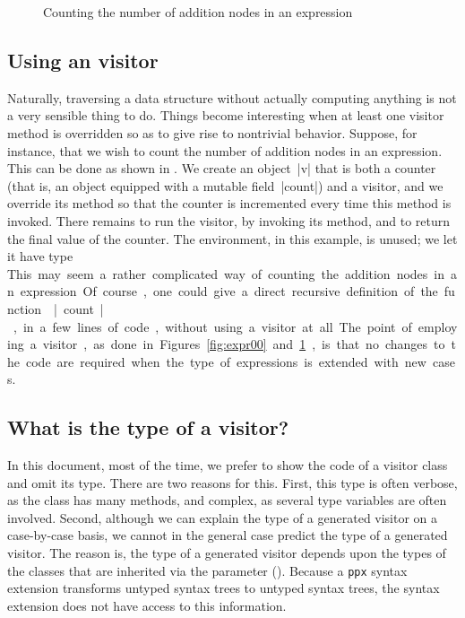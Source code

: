 \documentclass[11pt,a4paper,twoside]{article}
\begin{document}

\begin{figure}[t]
\caption{Counting the number of addition nodes in an expression}
\label{fig:expr04}
\end{figure}

\subsection{Using an \iter visitor}
\label{sec:intro:iter:usage}

Naturally, traversing a data structure without actually computing anything is
not a very sensible thing to do. Things become interesting when at least one
visitor method is overridden so as to give rise to nontrivial behavior.
Suppose, for instance, that we wish to count the number of addition nodes in
an expression. This can be done as shown in . We create an
object~\oc|v| that is both a counter (that is, an object equipped with a
mutable field~\oc|count|) and a visitor, and we override its method
 so that the counter is incremented every time this
method is invoked. There remains to run the visitor, by invoking its
 method, and to return the final value of the counter. The
environment, in this example, is unused; we let it have type \unit.

This may seem a rather complicated way of counting the addition nodes in an
expression. Of course, one could give a direct recursive definition of the
function \oc|count|, in a few lines of code, without using a visitor at all.
The point of employing a visitor, as done in Figures~\ref{fig:expr00}
and~\ref{fig:expr04}, is that no changes to the code are required when the
type of expressions is extended with new cases.


\subsection{What is the type of a visitor?}
\label{sec:intro:type}

In this document, most of the time, we prefer to show the code of a visitor
class and omit its type. There are two reasons for this. First, this type is
often verbose, as the class has many methods, and complex, as several type
variables are often involved. Second, although we can explain the type of a
generated visitor on a case-by-case basis, we cannot in the general case
predict the type of a generated visitor.
The reason is, the type of a generated visitor depends upon the
types of the classes that are inherited via the \ancestors parameter
(). Because a \texttt{ppx} syntax extension transforms
untyped syntax trees to untyped syntax trees, the \visitors syntax extension
does not have access to this information.
\end{document}

